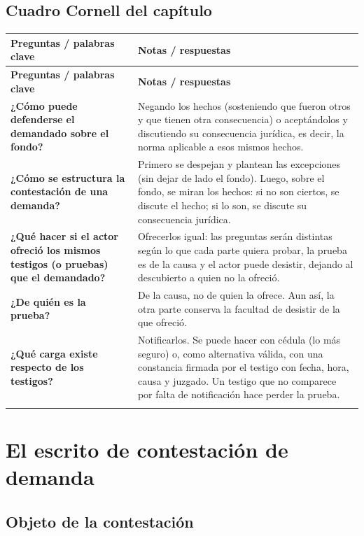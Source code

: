 \documentclass[12pt,oneside]{book}
\newenvironment{cornell}{%
  \begin{longtable}{>{\raggedright\arraybackslash}p{0.26\textwidth}>{\raggedright\arraybackslash}p{0.64\textwidth}}
  \toprule
  \textbf{Preguntas / palabras clave} & \textbf{Notas / respuestas} \\
  \midrule
  \endfirsthead
  \toprule
  \textbf{Preguntas / palabras clave} & \textbf{Notas / respuestas} \\
  \midrule
  \endhead
}{%
  \bottomrule
  \end{longtable}
}
\newcommand{\cornellresumen}[1]{%
  \midrule
  \multicolumn{2}{p{\dimexpr0.90\textwidth+2\tabcolsep\relax}}{\textbf{Resumen:} #1} \\
}
\begin{document}
\section{Cuadro Cornell del capítulo}

\begin{cornell}
\textbf{¿Cómo puede defenderse el demandado sobre el fondo?} &
Negando los hechos (sosteniendo que fueron otros y que tienen otra consecuencia) o aceptándolos y discutiendo su consecuencia jurídica, es decir, la norma aplicable a esos mismos hechos. \\
\addlinespace
\textbf{¿Cómo se estructura la contestación de una demanda?} &
Primero se despejan y plantean las excepciones (sin dejar de lado el fondo). Luego, sobre el fondo, se miran los hechos: si no son ciertos, se discute el hecho; si lo son, se discute su consecuencia jurídica. \\
\addlinespace
\textbf{¿Qué hacer si el actor ofreció los mismos testigos (o pruebas) que el demandado?} &
Ofrecerlos igual: las preguntas serán distintas según lo que cada parte quiera probar, la prueba es de la causa y el actor puede desistir, dejando al descubierto a quien no la ofreció. \\
\addlinespace
\textbf{¿De quién es la prueba?} &
De la causa, no de quien la ofrece. Aun así, la otra parte conserva la facultad de desistir de la que ofreció. \\
\addlinespace
\textbf{¿Qué carga existe respecto de los testigos?} &
Notificarlos. Se puede hacer con cédula (lo más seguro) o, como alternativa válida, con una constancia firmada por el testigo con fecha, hora, causa y juzgado. Un testigo que no comparece por falta de notificación hace perder la prueba. \\
\cornellresumen{Sobre el fondo se discuten los hechos o su consecuencia jurídica. En materia de prueba, la prueba es de la causa, por lo que conviene ofrecer incluso la que el actor ya ofreció, y es indispensable asegurar la comparecencia de los testigos notificándolos.}
\end{cornell}

\chapter[El escrito de contestación de demanda]{El escrito de contestación de demanda}

\section{Objeto de la contestación}
\end{document}
